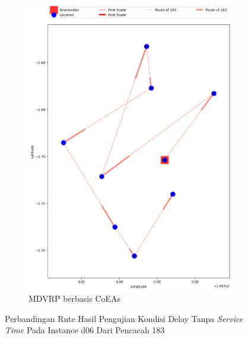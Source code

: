 \begin{figure}[H]
	\centering
	\begin{subfigure}[t]{\textwidth}
		\centering
		\includegraphics[width=\textwidth]{Resources/Images/delayed_6/real_m15_n100_delayed_6_183_coes}
		\caption{MDVRP berbasis CoEAs}
		\label{fig:real_m15_n100_delayed_6_183_coes}
	\end{subfigure}
	\caption{Perbandingan Rute Hasil Pengujian Kondisi Delay Tanpa \textit{Service Time} Pada Instance d06 Dari Pencacah 183}
	\label{fig:real_m15_n100_delayed_6_183}
\end{figure}


